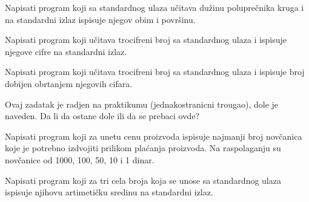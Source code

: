 \begin{Exercise}[label=v1.1_04] 
Napisati program koji sa standardnog ulaza učitava dužinu poluprečnika kruga
   i na standardni izlaz ispisuje njegov obim i površinu.
\end{Exercise}
\begin{Answer}[ref=v1.1_04]
\end{Answer}

\begin{Exercise}[label=v1.1_05] 
Napisati program koji učitava trocifreni broj sa standardnog ulaza i ispisuje njegove cifre na 
standardni izlaz.
\end{Exercise}
\begin{Answer}[ref=v1.1_05]
\end{Answer}

\begin{Exercise}[label=v1.1_06] 
Napisati program koji učitava trocifreni broj sa standardnog ulaza i ispisuje broj dobijen obrtanjem
njegovih cifara.
\end{Exercise}
\begin{Answer}[ref=v1.1_06]
\end{Answer}


\begin{Exercise}[label=v1.1_07] 
Ovaj zadatak je radjen na praktikumu (jednakostranicni trougao), dole je naveden. Da li da ostane dole ili da se prebaci ovde?
\end{Exercise}
\begin{Answer}[ref=v1.1_07]
\end{Answer}

\begin{Exercise}[label=v1.1_08] 
Napisati program koji za unetu cenu proizvoda ispisuje najmanji broj novčanica koje je potrebno izdvojiti prilikom plaćanja proizvoda. Na raspolaganju su novčanice od 1000, 100, 50, 10 i 1 dinar. 
\end{Exercise}
\begin{Answer}[ref=v1.1_08]
\end{Answer}

\begin{Exercise}[label=v1.1_09] 
Napisati program koji za tri cela broja koja se unose sa standardnog ulaza ispisuje njihovu artimetičku sredinu na standardni izlaz.
\end{Exercise}
\begin{Answer}[ref=v1.1_09]
\end{Answer}

